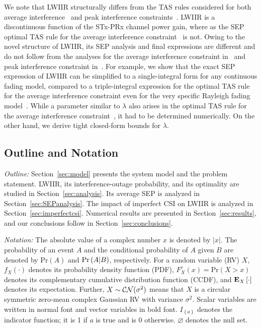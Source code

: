 \documentclass[12pt,draftcls,peerreview,onecolumn]{IEEEtran}
\newcommand{\brac}[1]{\left({#1}\right)}
\newcommand{\cbrac}[1]{\left\{{#1}\right\}}
\newcommand{\indic}[1]{I_{\cbrac{#1}}}
\newcommand{\explow}[2]{{\bf{E}}_{#1}\left[{#2}\right]}
\newcommand{\prob}[1]{\text{Pr}\brac{#1}}
\newcommand{\given}{\arrowvert}
\newcommand{\lam}{\lambda}
\newcommand{\nullset}{\varnothing}
\begin{document}
We note that LWIIR structurally differs from the TAS rules considered for both average interference~\cite{Sarvendranath_2013_TCOM,Sarvendranath_2014_TCOM,Wang_2011_TCom} and peak interference constraints~\cite{Wang_2010_TWC,Fakhan_2014_TSP}. LWIIR is a discontinuous function of the STx-PRx channel power gain, where as the SEP optimal TAS rule for the average interference constraint~\cite{Sarvendranath_2013_TCOM} is not. Owing to the novel structure of LWIIR, its SEP analysis and final expressions are different and do not follow from the analyses for the average interference constraint in~\cite{Sarvendranath_2013_TCOM} and peak interference constraint in~\cite{Fakhan_2014_TSP}. For example, we show that the exact SEP expression of LWIIR can be simplified to a single-integral form for any continuous fading model, compared to a triple-integral expression for the optimal TAS rule for the average interference constraint even for the very specific Rayleigh fading model~\cite{Sarvendranath_2013_TCOM}. While a parameter similar to $\lam$ also arises in the optimal TAS rule for the average interference constraint~\cite{Sarvendranath_2013_TCOM,Sarvendranath_2014_TCOM,Wang_2011_TCom}, it had to be determined numerically. On the other hand, we derive tight closed-form bounds for $\lam$.



\subsection{Outline and Notation}
{\em Outline:} Section~\ref{sec:model} presents the system model and the problem statement. LWIIR, its interference-outage probability, and its optimality are studied in Section~\ref{sec:analysis}. Its average SEP is analyzed in Section~\ref{sec:SEPanalysis}. The impact of imperfect CSI on LWIIR  is analyzed in Section~\ref{sec:imperfectcsi}. Numerical results are presented in Section~\ref{sec:results}, and our conclusions follow in Section~\ref{sec:conclusions}. %

\emph{Notation:} The absolute value of a complex number $x$ is denoted by $|x|$. The probability of an event $A$ and the conditional probability of $A$ given $B$ are denoted by $\prob{A}$ and $\prob{A \given B}$, respectively. For a random variable (RV) $X$, $f_{X}(\cdot)$ denotes its probability density function (PDF), $F_{X}^{c}(x)=\prob{X>x}$ denotes its complementary cumulative distribution function (CCDF), and $\explow{X}{\cdot}$ denotes its expectation. Further, $X \sim {\cal CN}(\sigma^2)$ means that $X$ is a circular symmetric zero-mean complex Gaussian RV with  variance $\sigma^2$.  Scalar variables are written in normal font and vector variables in bold font. $\indic{a}$ denotes the indicator function; it is 1 if $a$ is true and is 0 otherwise. $\nullset$ denotes the null set.
\end{document}
